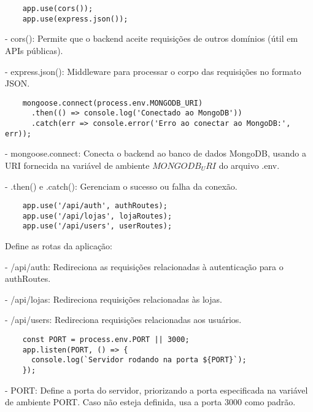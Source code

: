 \vspace{1cm}
\begin{lstlisting}
    app.use(cors());
    app.use(express.json());
\end{lstlisting}
\vspace{1cm}

- cors(): Permite que o backend aceite requisições de outros domínios (útil em APIs públicas).

- express.json(): Middleware para processar o corpo das requisições no formato JSON.

\vspace{1cm}
\begin{lstlisting}
    mongoose.connect(process.env.MONGODB_URI)
      .then(() => console.log('Conectado ao MongoDB'))
      .catch(err => console.error('Erro ao conectar ao MongoDB:', err));
\end{lstlisting}
\vspace{1cm}

- mongoose.connect: Conecta o backend ao banco de dados MongoDB, 
usando a URI fornecida na variável de ambiente $MONGODB_URI$ do arquivo .env.

- .then() e .catch(): Gerenciam o sucesso ou falha da conexão.

\vspace{1cm}
\begin{lstlisting}
    app.use('/api/auth', authRoutes);
    app.use('/api/lojas', lojaRoutes);
    app.use('/api/users', userRoutes);
\end{lstlisting}
\vspace{1cm}

Define as rotas da aplicação:

- /api/auth: Redireciona as requisições relacionadas à autenticação para o authRoutes.

- /api/lojas: Redireciona requisições relacionadas às lojas.

- /api/users: Redireciona requisições relacionadas aos usuários.

\vspace{1cm}
\begin{lstlisting}
    const PORT = process.env.PORT || 3000;
    app.listen(PORT, () => {
      console.log(`Servidor rodando na porta ${PORT}`);
    });
\end{lstlisting}
\vspace{1cm}

- PORT: Define a porta do servidor, priorizando a porta especificada na variável de ambiente PORT. 
Caso não esteja definida, usa a porta 3000 como padrão.

